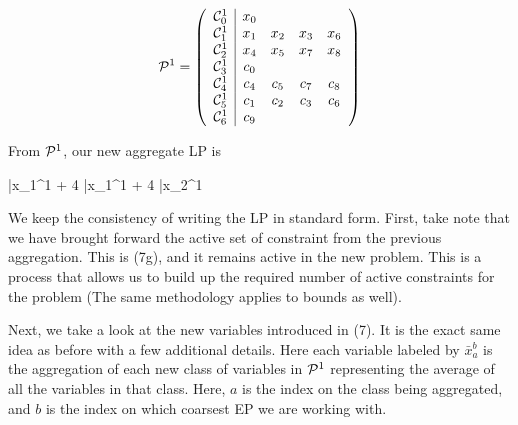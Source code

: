 \documentclass[11pt]{article} %
\newcommand{\cP}{{\cal P}}
\newcommand{\cC}{{\cal C}}
\begin{document}
	\begin{equation}
	\mathcal{P}^1 = 
	\begin{pmatrix}
	\begin{array}{c|cccc}
	\cC_0^1 & x_0 &&& \\
	\cC_1^1 & x_1 & x_2 & x_3 & x_6 \\
	\cC_2^1& x_4 & x_5 & x_7 & x_8 \\
	\cC_3^1 & c_0 &&& \\
	\cC_4^1 & c_4 & c_5 & c_7 & c_8 \\
	\cC_5^1 & c_1 & c_2 & c_3 & c_6 \\
	\cC_6^1 & c_9 &&&
 	\end{array}
	\end{pmatrix}
	\end{equation}
	
	From $\cP^1$, our new aggregate LP is 
	
	\begin{mini!}
		{}{\bar{x}_1^1 + 4 \bar{x}_1^1 + 4 \bar{x}_2^1}{}{}
	\end{mini!}

	We keep the consistency of writing the LP in standard form.  First, take note that we have brought forward the active set of constraint from the previous aggregation.  This is (7g), and it remains active in the new problem.  This is a process that allows us to build up the required number of active constraints for the problem (The same methodology applies to bounds as well).
	
	Next, we take a look at the new variables introduced in (7).  It is the exact same idea as before with a few additional details.  Here each variable labeled by $\bar{x}_a^b$ is the aggregation of each new class of variables in $\cP^1$ representing the average of all the variables in that class.  Here, $a$ is the index on the class being aggregated, and $b$ is the index on which coarsest EP we are working with.  
	
\end{document}
